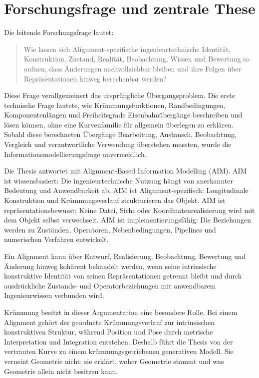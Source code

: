 \section{Forschungsfrage und zentrale These}

Die leitende Forschungsfrage lautet:

\begin{quote}
Wie lassen sich Alignment-spezifische ingenieurtechnische Identität,
Konstruktion, Zustand, Realität, Beobachtung, Wissen und Bewertung so ordnen,
dass Änderungen nachvollziehbar bleiben und ihre Folgen über Repräsentationen
hinweg berechenbar werden?
\end{quote}

Diese Frage verallgemeinert das ursprüngliche Übergangsproblem. Die erste
technische Frage lautete, wie Krümmungsfunktionen, Randbedingungen,
Komponentenlängen und Freiheitsgrade Eisenbahnübergänge beschreiben und lösen
können, ohne eine Kurvenfamilie für allgemein überlegen zu erklären. Sobald
diese berechneten Übergänge Bearbeitung, Austausch, Beobachtung, Vergleich und
verantwortliche Verwendung überstehen mussten, wurde die
Informationsmodellierungsfrage unvermeidlich.

Die Thesis antwortet mit Alignment-Based Information Modelling (AIM). AIM ist
wissensbasiert: Die ingenieurtechnische Nutzung hängt von anerkannter Bedeutung
und Anwendbarkeit ab. AIM ist Alignment-spezifisch: Longitudinale Konstruktion
und Krümmungsverlauf strukturieren das Objekt. AIM ist
repräsentationsbewusst: Keine Datei, Sicht oder Koordinatenrealisierung wird
mit dem Objekt selbst verwechselt. AIM ist implementierungsfähig: Die
Beziehungen werden zu Zuständen, Operatoren, Nebenbedingungen, Pipelines und
numerischen Verfahren entwickelt.

\begin{proposition}
Ein Alignment kann über Entwurf, Realisierung, Beobachtung, Bewertung und
Änderung hinweg kohärent behandelt werden, wenn seine intrinsische konstruktive
Identität von seinen Repräsentationen getrennt bleibt und durch ausdrückliche
Zustands- und Operatorbeziehungen mit anwendbarem Ingenieurwissen verbunden
wird.
\end{proposition}

Krümmung besitzt in dieser Argumentation eine besondere Rolle. Bei einem
Alignment gehört der geordnete Krümmungsverlauf zur intrinsischen
konstruktiven Struktur, während Position und Pose durch metrische
Interpretation und Integration entstehen. Deshalb führt die Thesis von der
vertrauten Kurve zu einem krümmungsgetriebenen generativen Modell. Sie
verneint Geometrie nicht; sie erklärt, woher Geometrie stammt und was
Geometrie allein nicht besitzen kann.


